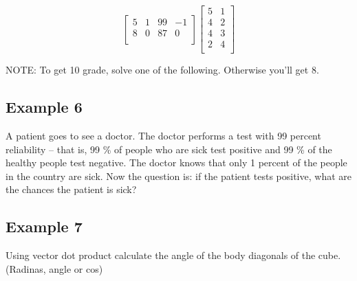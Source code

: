 \documentclass{article}
\begin{document}
\begin{equation}
	\left[
	\begin{array}{cccc}
	
	5 & 1 & 99 & -1\\
	8 & 0 & 87 & 0\\
	
\end{array}
	\right]
	\left[
	\begin{array}{cc}
	5 & 1 \\
	4 & 2 \\
	4 & 3 \\
	2 & 4 \\  
\end{array}
	\right]
\end{equation}

\vspace{2cm}

NOTE: To get 10 grade, solve one of the following. Otherwise you'll get 8. 

\subsection{Example 6}
A patient goes to see a doctor. The doctor performs a test with 99 percent reliability -- that is, 99 \% of people who are sick test positive and 99 \% of the healthy people test negative. The doctor knows that only 1 percent of the people in the country are sick. Now the question is: if the patient tests positive, what are the chances the patient is sick?

\subsection{Example 7}
Using vector dot product calculate the angle of the body diagonals of the cube. (Radinas, angle or cos)
\end{document}

